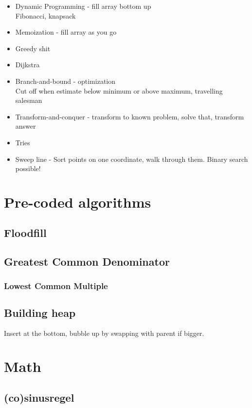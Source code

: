 \documentclass[10pt,hidelinks]{article}
\begin{document}
\begin{itemize}
\item Dynamic Programming - fill array bottom up \\
	Fibonacci, knapsack
\item Memoization - fill array as you go
\item Greedy shit
\item Dijkstra
\item Branch-and-bound - optimization \\
	Cut off when estimate below minimum or above maximum, travelling salesman
\item Transform-and-conquer - transform to known problem, solve that, transform answer
\item Tries
\item Sweep line - Sort points on one coordinate, walk through them. Binary search possible!
\end{itemize}

\pagebreak

\section{Pre-coded algorithms}

\subsection{Floodfill}


\subsection{Greatest Common Denominator}


\subsubsection{Lowest Common Multiple}


\subsection{Building heap}
Insert at the bottom, bubble up by swapping with parent if bigger.

\section{Math}


\subsection{(co)sinusregel}
\end{document}
